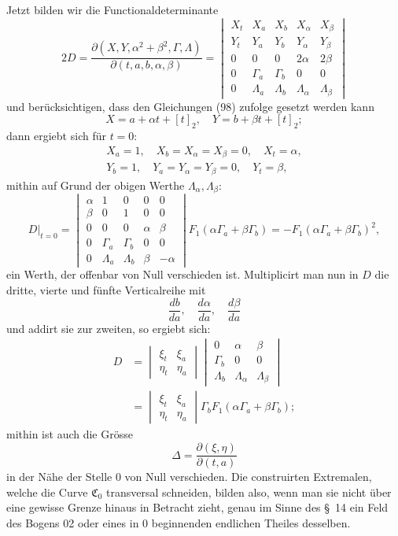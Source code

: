 \documentclass[11pt,a4paper,leqno]{article}
\begin{document}
Jetzt bilden wir die Functionaldeterminante
\[
2D=\frac{\partial(X,Y,\alpha^2+\beta^2,\Gamma,\Lambda)}{\partial(t,a,b,\alpha,\beta)}
=
\begin{vmatrix}
X_t&X_a&X_b&X_{\alpha}&X_{\beta}\\
Y_t&Y_a&Y_b&Y_{\alpha}&Y_{\beta}\\
0&0&0&2\alpha&2\beta\\
0&\Gamma_a&\Gamma_b&0&0\\
0&\Lambda_a&\Lambda_b&\Lambda_{\alpha}&\Lambda_{\beta}
\end{vmatrix}
\]
und berücksichtigen, dass den Gleichungen (98) zufolge gesetzt werden kann
\[
X=a+\alpha t+[t]_2,
\quad
Y=b+\beta t+[t]_2;
\]
dann ergiebt sich für $t=0$:
\[
\begin{gathered}
X_a=1,
\quad X_b=X_{\alpha}=X_{\beta}=0,
\quad X_t=\alpha,\\
Y_b=1,
\quad Y_a=Y_{\alpha}=Y_{\beta}=0,
\quad Y_t=\beta,
\end{gathered}
\]
mithin auf Grund der obigen Werthe $\Lambda_{\alpha},\Lambda_{\beta}$:
\[
D\big|_{t=0}=
\begin{vmatrix}
\alpha&1&0&0&0\\
\beta&0&1&0&0\\
0&0&0&\alpha&\beta\\
0&\Gamma_a&\Gamma_b&0&0\\
0&\Lambda_a&\Lambda_b&\beta&-\alpha
\end{vmatrix}
F_1(\alpha\Gamma_a+\beta\Gamma_b)
=-F_1(\alpha\Gamma_a+
\beta\Gamma_b)^2,
\]
ein Werth, der offenbar von Null verschieden ist. Multiplicirt man nun in $D$ die dritte, vierte und fünfte Verticalreihe mit
\[
\frac{db}{da},\quad \frac{d\alpha}{da},\quad \frac{d\beta}{da}
\]
und addirt sie zur zweiten, so ergiebt sich:
\[
\begin{aligned}
D
&=
\begin{vmatrix}
\xi_t&\xi_a\\
\eta_t&\eta_a
\end{vmatrix}
\begin{vmatrix}
0&\alpha&\beta\\
\Gamma_b&0&0\\
\Lambda_b&\Lambda_{\alpha}&\Lambda_{\beta}
\end{vmatrix}\\
&=
\begin{vmatrix}
\xi_t&\xi_a\\
\eta_t&\eta_a
\end{vmatrix}
\Gamma_bF_1(\alpha\Gamma_a+\beta\Gamma_b);
\end{aligned}
\]
mithin ist auch die Grösse
\[
\Delta=\frac{\partial(\xi,\eta)}{\partial(t,a)}
\]
in der Nähe der Stelle 0 von Null verschieden. Die construirten Extremalen, welche die Curve $\mathfrak C_0$ transversal schneiden, bilden also, wenn man sie nicht über eine gewisse Grenze hinaus in Betracht zieht, genau im Sinne des \S~14 ein Feld des Bogens 02 oder eines in 0 beginnenden endlichen Theiles desselben.
\end{document}
